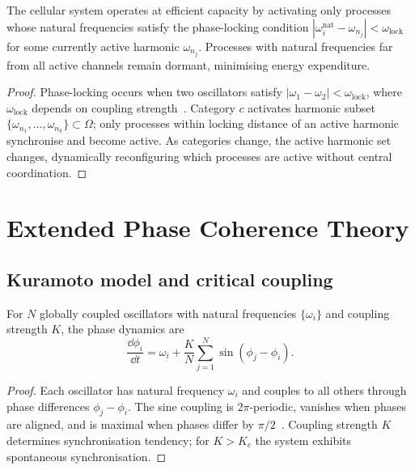 \begin{theorem}
\label{thm:ch07-efficient-capacity}
The cellular system operates at efficient capacity by activating only
processes whose natural frequencies satisfy the phase-locking condition
$|\omega_i^{\mathrm{nat}} - \omega_{n_j}| < \omega_{\mathrm{lock}}$ for
some currently active harmonic $\omega_{n_j}$.  Processes with natural
frequencies far from all active channels remain dormant, minimising energy
expenditure.
\end{theorem}

\begin{proof}
Phase-locking occurs when two oscillators satisfy $|\omega_1 - \omega_2|
< \omega_{\mathrm{lock}}$, where $\omega_{\mathrm{lock}}$ depends on coupling
strength~\citep{Strogatz2000}.  Category $c$ activates harmonic subset
$\{\omega_{n_1},\ldots,\omega_{n_k}\} \subset \Omega$; only processes within
locking distance of an active harmonic synchronise and become active.
As categories change, the active harmonic set changes, dynamically
reconfiguring which processes are active without central coordination.
\end{proof}

\section{Extended Phase Coherence Theory}
\label{sec:ch07-phase-coherence-ext}

\subsection{Kuramoto model and critical coupling}

\begin{theorem}
\label{thm:ch07-kuramoto}
For $N$ globally coupled oscillators with natural frequencies
$\{\omega_i\}$ and coupling strength $K$, the phase dynamics are
\begin{equation}
  \frac{\dd\phi_i}{\dd t}
  = \omega_i + \frac{K}{N}\sum_{j=1}^{N}\sin(\phi_j - \phi_i).
  \label{eq:ch07-kuramoto}
\end{equation}
\end{theorem}

\begin{proof}
Each oscillator has natural frequency $\omega_i$ and couples to all others
through phase differences $\phi_j - \phi_i$.  The sine coupling is
$2\pi$-periodic, vanishes when phases are aligned, and is maximal when phases
differ by $\pi/2$~\citep{Kuramoto1984}.  Coupling strength $K$ determines
synchronisation tendency; for $K > K_c$ the system exhibits spontaneous
synchronisation.
\end{proof}

